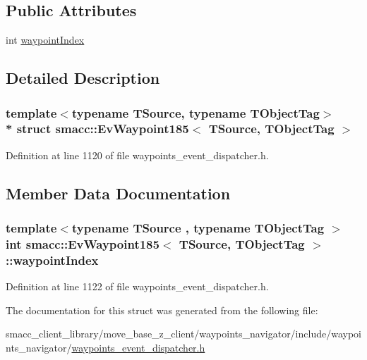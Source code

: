 \subsection*{Public Attributes}
\begin{DoxyCompactItemize}
\item 
int \hyperlink{structsmacc_1_1EvWaypoint185_a5958ba9cb64d03582eec1fc031730f65}{waypoint\+Index}
\end{DoxyCompactItemize}


\subsection{Detailed Description}
\subsubsection*{template$<$typename T\+Source, typename T\+Object\+Tag$>$\\*
struct smacc\+::\+Ev\+Waypoint185$<$ T\+Source, T\+Object\+Tag $>$}



Definition at line 1120 of file waypoints\+\_\+event\+\_\+dispatcher.\+h.



\subsection{Member Data Documentation}
\subsubsection[{\texorpdfstring{waypoint\+Index}{waypointIndex}}]{\setlength{\rightskip}{0pt plus 5cm}template$<$typename T\+Source , typename T\+Object\+Tag $>$ int {\bf smacc\+::\+Ev\+Waypoint185}$<$ T\+Source, T\+Object\+Tag $>$\+::waypoint\+Index}\hypertarget{structsmacc_1_1EvWaypoint185_a5958ba9cb64d03582eec1fc031730f65}{}\label{structsmacc_1_1EvWaypoint185_a5958ba9cb64d03582eec1fc031730f65}


Definition at line 1122 of file waypoints\+\_\+event\+\_\+dispatcher.\+h.



The documentation for this struct was generated from the following file\+:\begin{DoxyCompactItemize}
\item 
smacc\+\_\+client\+\_\+library/move\+\_\+base\+\_\+z\+\_\+client/waypoints\+\_\+navigator/include/waypoints\+\_\+navigator/\hyperlink{waypoints__event__dispatcher_8h}{waypoints\+\_\+event\+\_\+dispatcher.\+h}\end{DoxyCompactItemize}
